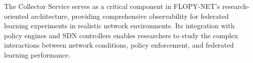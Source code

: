 The Collector Service serves as a critical component in FLOPY-NET's research-oriented architecture, providing comprehensive observability for federated learning experiments in realistic network environments. Its integration with policy engines and SDN controllers enables researchers to study the complex interactions between network conditions, policy enforcement, and federated learning performance.

